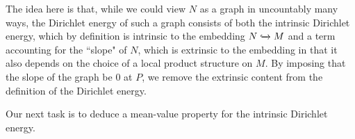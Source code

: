 \documentclass[reqno,12pt,letterpaper]{amsart}
\theoremstyle{definition}
\numberwithin{equation}{section}
\begin{document}
The idea here is that, while we could view $N$ as a graph in uncountably many ways, the Dirichlet energy of such a graph consists of both the intrinsic Dirichlet energy, which by definition is intrinsic to the embedding $N \xhookrightarrow{} M$ and a term accounting for the ``slope" of $N$, which is extrinsic to the embedding in that it also depends on the choice of a local product structure on $M$.
By imposing that the slope of the graph be $0$ at $P$, we remove the extrinsic content from the definition of the Dirichlet energy.

Our next task is to deduce a mean-value property for the intrinsic Dirichlet energy.

\printbibliography
\end{document}

